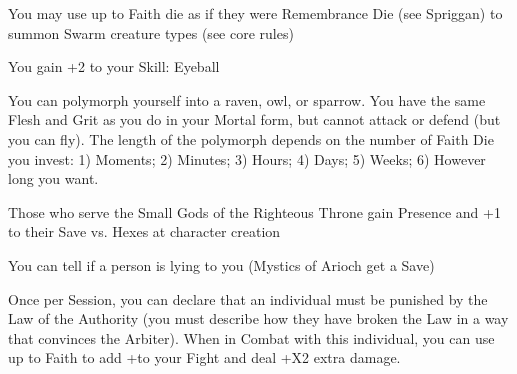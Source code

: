 {

You may use up to \LVL  Faith die as if they were Remembrance Die (see Spriggan) to summon Swarm creature types (see core rules)






\GOD[
Name=Tyaa,
Link=small-god-tyaa,
GodOf=Archon of Birds,
Holy=a short cloak of feathers
]


You gain +2 to your Skill: Eyeball


You can polymorph yourself into a raven, owl, or sparrow.  You have the same Flesh and Grit as you do in your Mortal form, but cannot attack or defend (but you can fly).  The length of the polymorph depends on the number of Faith Die you invest:  1) Moments; 2) Minutes; 3) Hours; 4) Days; 5) Weeks; 6) However long you want.

\newpage






Those who serve the Small Gods of the Righteous Throne gain \DCUP Presence and +1 to their Save vs. Hexes at character creation





\GOD[
Name=Anubis,
Link=small-god-anubis,
GodOf=Fiend of Judgement and Punishment,
Holy=a set of scales hung from a chain
]


You can tell if a person is lying to you (Mystics of Arioch get a Save)


Once per Session, you can declare that an individual must be punished by the Law of the Authority (you must describe how they have broken the Law in a way that convinces the Arbiter).  When in Combat with this individual, you can use up to \LVL Faith to add +\SUMDICE to your Fight \RO and deal +\DICE X2 extra damage.





}
